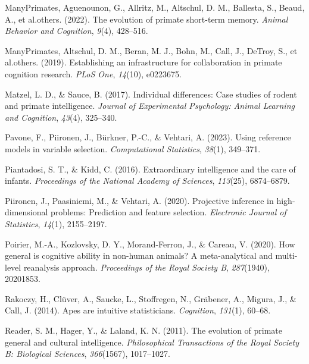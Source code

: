 \documentclass[
  man,floatsintext]{apa6}
\newlength{\cslhangindent}
\newenvironment{CSLReferences}[2] %
 {\begin{list}{}{%
  \setlength{\itemindent}{0pt}
  \setlength{\leftmargin}{0pt}
  \setlength{\parsep}{0pt}
  \ifodd #1
   \setlength{\leftmargin}{\cslhangindent}
   \setlength{\itemindent}{-1\cslhangindent}
  \fi
  \setlength{\itemsep}{#2\baselineskip}}}
 {\end{list}}
\begin{document}
\begin{CSLReferences}{1}{0}
ManyPrimates, Aguenounon, G., Allritz, M., Altschul, D. M., Ballesta, S., Beaud, A., et al.others. (2022). The evolution of primate short-term memory. \emph{Animal Behavior and Cognition}, \emph{9}(4), 428--516.

ManyPrimates, Altschul, D. M., Beran, M. J., Bohn, M., Call, J., DeTroy, S., et al.others. (2019). Establishing an infrastructure for collaboration in primate cognition research. \emph{PLoS One}, \emph{14}(10), e0223675.

Matzel, L. D., \& Sauce, B. (2017). Individual differences: Case studies of rodent and primate intelligence. \emph{Journal of Experimental Psychology: Animal Learning and Cognition}, \emph{43}(4), 325--340.

Pavone, F., Piironen, J., Bürkner, P.-C., \& Vehtari, A. (2023). Using reference models in variable selection. \emph{Computational Statistics}, \emph{38}(1), 349--371.

Piantadosi, S. T., \& Kidd, C. (2016). Extraordinary intelligence and the care of infants. \emph{Proceedings of the National Academy of Sciences}, \emph{113}(25), 6874--6879.

Piironen, J., Paasiniemi, M., \& Vehtari, A. (2020). {Projective inference in high-dimensional problems: Prediction and feature selection}. \emph{Electronic Journal of Statistics}, \emph{14}(1), 2155--2197.

Poirier, M.-A., Kozlovsky, D. Y., Morand-Ferron, J., \& Careau, V. (2020). How general is cognitive ability in non-human animals? A meta-analytical and multi-level reanalysis approach. \emph{Proceedings of the Royal Society B}, \emph{287}(1940), 20201853.

Rakoczy, H., Clüver, A., Saucke, L., Stoffregen, N., Gräbener, A., Migura, J., \& Call, J. (2014). Apes are intuitive statisticians. \emph{Cognition}, \emph{131}(1), 60--68.

Reader, S. M., Hager, Y., \& Laland, K. N. (2011). The evolution of primate general and cultural intelligence. \emph{Philosophical Transactions of the Royal Society B: Biological Sciences}, \emph{366}(1567), 1017--1027.


\end{CSLReferences}
\end{document}
